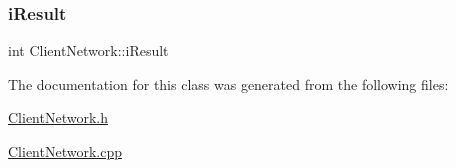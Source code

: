 \mbox{\label{class_client_network_abd41d3abe0a3816b17c1f7f2f7954791}} 
\subsubsection{\texorpdfstring{i\+Result}{iResult}}
{\footnotesize\ttfamily int Client\+Network\+::i\+Result}



The documentation for this class was generated from the following files\+:\begin{DoxyCompactItemize}
\item 
\mbox{\hyperlink{_client_network_8h}{Client\+Network.\+h}}\item 
\mbox{\hyperlink{_client_network_8cpp}{Client\+Network.\+cpp}}\end{DoxyCompactItemize}
